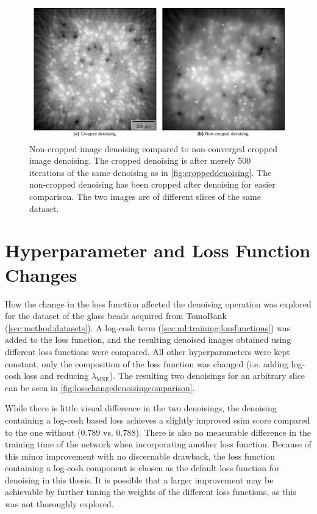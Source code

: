 \begin{figure}[htbp]
  \centering
  \includegraphics[width=.9\textwidth]{figures/croppednoncroppedearly.pdf}
  \caption[Non-cropped image denoising compared to non-converged cropped image denoising]{Non-cropped image denoising compared to non-converged cropped image denoising. The cropped denoising is after merely $500$ iterations of the same denoising as in \cref{fig:croppeddenoising}. The non-cropped denoising has been cropped after denoising for easier comparison. The two images are of different slices of the same dataset. }
  \label{fig:croppednoncroppedearly}
\end{figure}

\section{Hyperparameter and Loss Function Changes}
How the change in the loss function affected the denoising operation was explored for the dataset of the glass beads acquired from TomoBank (\cref{sec:method:datasets}). A log-cosh term (\cref{sec:ml:training:lossfunctions}) was added to the loss function, and the resulting denoised images obtained using different loss functions were compared. All other hyperparameters were kept constant, only the composition of the loss function was changed (i.e. adding log-cosh loss and reducing $\lambda_{\text{MSE}}$). The resulting two denoisings for an arbitrary slice can be seen in \cref{fig:losschangedenoisingcomparison}. 

While there is little visual difference in the two denoisings, the denoising containing a log-cosh based loss achieves a slightly improved \gls{ssim} score compared to the one without ($0.789$ vs. $0.788$). There is also no measurable difference in the training time of the network when incorporating another loss function. Because of this minor improvement with no discernable drawback, the loss function containing a log-cosh component is chosen as the default loss function for denoising in this thesis. It is possible that a larger improvement may be achievable by further tuning the weights of the different loss functions, as this was not thoroughly explored. 

